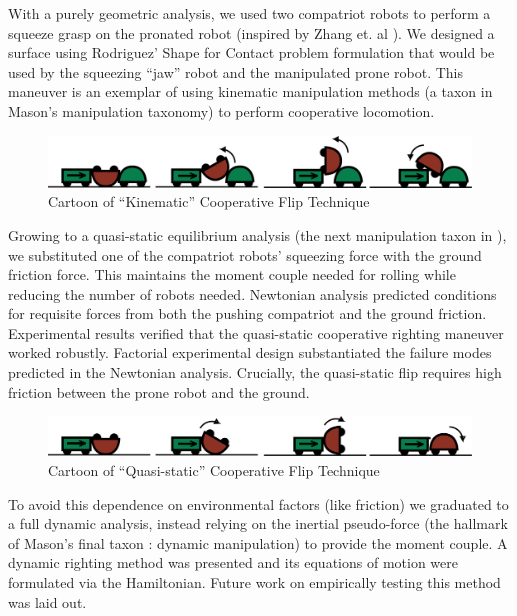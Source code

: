 \documentclass[letterpaper]{report}
\begin{document}
With a purely geometric analysis, we used two compatriot robots to perform a squeeze grasp on the pronated robot (inspired by Zhang et. al \cite{zhang2002gripper}).
We designed a surface using Rodriguez' Shape for Contact \cite{rodriguez2013effector} problem formulation that would be used by the squeezing ``jaw'' robot and the manipulated prone robot.
This maneuver is an exemplar of using kinematic manipulation methods (a taxon in Mason's \cite{MasonMORMBook} manipulation taxonomy) to perform cooperative locomotion.

\begin{figure}[ht]
\centering
\includegraphics[width=1.0\textwidth]{Kinematic_CoopCartoon.png}
\caption{Cartoon of ``Kinematic'' Cooperative Flip Technique}
\end{figure}

Growing to a quasi-static equilibrium analysis (the next manipulation taxon in \cite{MasonMORMBook}), we substituted one of the compatriot robots' squeezing force with the ground friction force.
This maintains the moment couple needed for rolling while reducing the number of robots needed.
Newtonian analysis predicted conditions for requisite forces from both the pushing compatriot and the ground friction.
Experimental results verified that the quasi-static cooperative righting maneuver worked robustly.
Factorial experimental design substantiated the failure modes predicted in the Newtonian analysis.
Crucially, the quasi-static flip requires high friction between the prone robot and the ground.

\begin{figure}[ht]
\centering
\includegraphics[width=1.0\textwidth]{QuasiStatic_CoopCartoon.png}
\caption{Cartoon of ``Quasi-static'' Cooperative Flip Technique}
\end{figure}

To avoid this dependence on environmental factors (like friction) we graduated to a full dynamic analysis, instead relying on the inertial pseudo-force (the hallmark of Mason's final taxon \cite{MasonMORMBook}: dynamic manipulation) to provide the moment couple.
A dynamic righting method was presented and its equations of motion were formulated via the Hamiltonian.
Future work on empirically testing this method was laid out.
\end{document}
